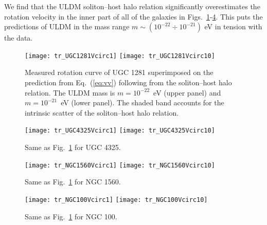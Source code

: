 \documentclass[aps,prd,floats,superscriptaddress,showpacs,nofootinbib,twocolumn,preprintnumbers]{revtex4-1}%
\begin{document}
We find that the ULDM soliton--host halo relation  
significantly overestimates the rotation velocity in the inner part of
all of the galaxies in Figs.~\ref{fig:manygal1}-\ref{fig:manygal4}.  This puts the predictions of ULDM in the mass range $m\sim (10^{-22}\div 10^{-21})$ eV in tension with the data.
%
\begin{figure}[hbp!]
\centering
\texttt{[image: tr\_UGC1281Vcirc1]}
\texttt{[image: tr\_UGC1281Vcirc10]}
\caption{Measured rotation curve of UGC 1281 superimposed on the
  prediction from Eq.~(\ref{eq:vv}) following from the soliton--host
  halo relation. 
The ULDM mass is $m=10^{-22}$~eV (upper panel) and
  $m=10^{-21}$~eV (lower panel). 
The shaded band accounts for the intrinsic scatter of
  the soliton--host 
  halo relation. 
}\label{fig:manygal1}
\end{figure}
%
%
\begin{figure}[hbp!]
\centering
\texttt{[image: tr\_UGC4325Vcirc1]}
\texttt{[image: tr\_UGC4325Vcirc10]}
\caption{Same as Fig.~\ref{fig:manygal1} for UGC 4325.
}\label{fig:manygal2}
\end{figure}
%
%
\begin{figure}[hbp!]
\centering
\texttt{[image: tr\_NGC1560Vcirc1]}
\texttt{[image: tr\_NGC1560Vcirc10]}
\caption{Same as Fig.~\ref{fig:manygal1} for NGC 1560.
}\label{fig:manygal3}
\end{figure}
%
%
\begin{figure}[hbp!]
\centering
\texttt{[image: tr\_NGC100Vcirc1]}
\texttt{[image: tr\_NGC100Vcirc10]}
\caption{Same as Fig.~\ref{fig:manygal1} for NGC 100.
}\label{fig:manygal4}
\end{figure}
%
\end{document}
